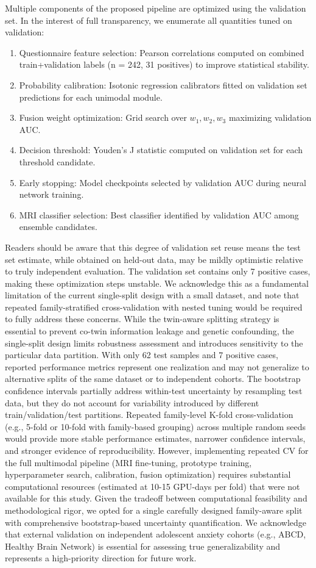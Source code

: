 \documentclass[10pt,letterpaper]{article}
\begin{document}
Multiple components of the proposed pipeline are optimized using the validation set. In the interest of full transparency, we enumerate all quantities tuned on validation:
\begin{enumerate}
    \item Questionnaire feature selection: Pearson correlations computed on combined train+validation labels (n = 242, 31 positives) to improve statistical stability.
    \item Probability calibration: Isotonic regression calibrators fitted on validation set predictions for each unimodal module.
    \item Fusion weight optimization: Grid search over $w_1, w_2, w_3$ maximizing validation AUC.
    \item Decision threshold: Youden's J statistic computed on validation set for each threshold candidate.
    \item Early stopping: Model checkpoints selected by validation AUC during neural network training.
    \item MRI classifier selection: Best classifier identified by validation AUC among ensemble candidates.
\end{enumerate}
Readers should be aware that this degree of validation set reuse means the test set estimate, while obtained on held-out data, may be mildly optimistic relative to truly independent evaluation. The validation set contains only 7 positive cases, making these optimization steps unstable. We acknowledge this as a fundamental limitation of the current single-split design with a small dataset, and note that repeated family-stratified cross-validation with nested tuning would be required to fully address these concerns. While the twin-aware splitting strategy is essential to prevent co-twin information leakage and genetic confounding, the single-split design limits robustness assessment and introduces sensitivity to the particular data partition. With only 62 test samples and 7 positive cases, reported performance metrics represent one realization and may not generalize to alternative splits of the same dataset or to independent cohorts. The bootstrap confidence intervals partially address within-test uncertainty by resampling test data, but they do not account for variability introduced by different train/validation/test partitions. Repeated family-level K-fold cross-validation (e.g., 5-fold or 10-fold with family-based grouping) across multiple random seeds would provide more stable performance estimates, narrower confidence intervals, and stronger evidence of reproducibility. However, implementing repeated CV for the full multimodal pipeline (MRI fine-tuning, prototype training, hyperparameter search, calibration, fusion optimization) requires substantial computational resources (estimated at 10-15 GPU-days per fold) that were not available for this study. Given the tradeoff between computational feasibility and methodological rigor, we opted for a single carefully designed family-aware split with comprehensive bootstrap-based uncertainty quantification. We acknowledge that external validation on independent adolescent anxiety cohorts (e.g., ABCD, Healthy Brain Network) is essential for assessing true generalizability and represents a high-priority direction for future work.
\end{document}
